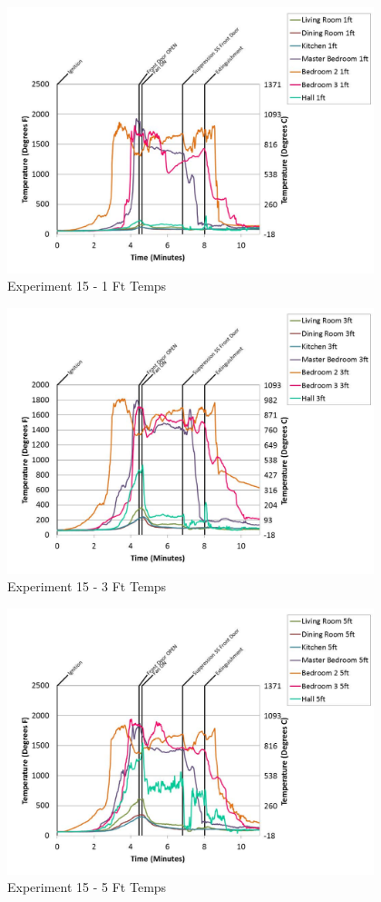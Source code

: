 \documentclass{article}
\begin{document}
\begin{appendices}
	\begin{figure}[h!]
		\centering
		\includegraphics[height=3.05in]{0_Images/Results_Charts/Exp_15_Charts/1FtTemps.pdf}
		\caption{Experiment 15 - 1 Ft Temps}
	\end{figure}
 

	\begin{figure}[h!]
		\centering
		\includegraphics[height=3.05in]{0_Images/Results_Charts/Exp_15_Charts/3FtTemps.pdf}
		\caption{Experiment 15 - 3 Ft Temps}
	\end{figure}
 
	\clearpage

	\begin{figure}[h!]
		\centering
		\includegraphics[height=3.05in]{0_Images/Results_Charts/Exp_15_Charts/5FtTemps.pdf}
		\caption{Experiment 15 - 5 Ft Temps}
	\end{figure}
 


\end{appendices}
\end{document}
